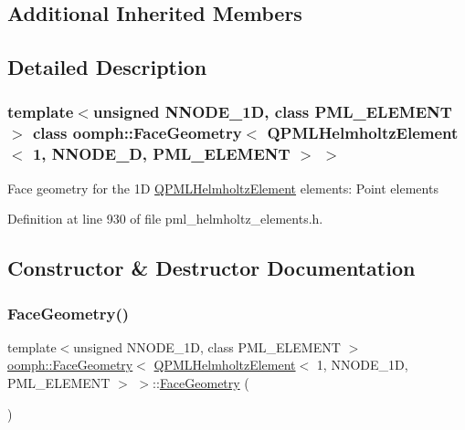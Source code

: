 \subsection*{Additional Inherited Members}


\subsection{Detailed Description}
\subsubsection*{template$<$unsigned N\+N\+O\+D\+E\+\_\+1D, class P\+M\+L\+\_\+\+E\+L\+E\+M\+E\+NT$>$\newline
class oomph\+::\+Face\+Geometry$<$ Q\+P\+M\+L\+Helmholtz\+Element$<$ 1, N\+N\+O\+D\+E\+\_\+D, P\+M\+L\+\_\+\+E\+L\+E\+M\+E\+N\+T $>$ $>$}

Face geometry for the 1D \hyperlink{classoomph_1_1QPMLHelmholtzElement}{Q\+P\+M\+L\+Helmholtz\+Element} elements\+: Point elements 

Definition at line 930 of file pml\+\_\+helmholtz\+\_\+elements.\+h.



\subsection{Constructor \& Destructor Documentation}
\mbox{\label{classoomph_1_1FaceGeometry_3_01QPMLHelmholtzElement_3_011_00_01NNODE__1D_00_01PML__ELEMENT_01_4_01_4_a6af5dd5e57ad9bf66145033ad0146e7e}} 
\subsubsection{\texorpdfstring{Face\+Geometry()}{FaceGeometry()}}
{\footnotesize\ttfamily template$<$unsigned N\+N\+O\+D\+E\+\_\+1D, class P\+M\+L\+\_\+\+E\+L\+E\+M\+E\+NT $>$ \\
\hyperlink{classoomph_1_1FaceGeometry}{oomph\+::\+Face\+Geometry}$<$ \hyperlink{classoomph_1_1QPMLHelmholtzElement}{Q\+P\+M\+L\+Helmholtz\+Element}$<$ 1, N\+N\+O\+D\+E\+\_\+1D, P\+M\+L\+\_\+\+E\+L\+E\+M\+E\+NT $>$ $>$\+::\hyperlink{classoomph_1_1FaceGeometry}{Face\+Geometry} (\begin{DoxyParamCaption}{ }\end{DoxyParamCaption})\hspace{0.3cm}{\ttfamily [inline]}}



